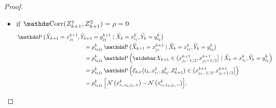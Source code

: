 \begin{proof}
	\begin{itemize}[wide=0pt]
		\item if $\Corr(Z_{k+1}^1, Z_{k+1}^2) = \rho = 0$
		      \begin{equation*}
			      \begin{aligned}
				       & \Prob \big( \widehat X_{k+1} = x_{j_1}^{k+1}, \widehat Y_{k+1} = y_{j_2}^{k+1} \mid \widehat X_k = x_{i_1}^k, \widehat Y_k = y_{i_2}^k \big)                                                             \\
				       & \qquad \qquad \qquad \qquad \qquad \qquad= p_{i_2 j_2}^k \Prob \big( \widehat X_{k+1} = x_{j_1}^{k+1} \mid \widehat X_k = x_{i_1}^k, \widehat Y_k = y_{i_2}^k \big)                                      \\
				       & \qquad \qquad \qquad \qquad \qquad \qquad= p_{i_2 j_2}^k \Prob \Big( \widebar X_{k+1} \in \big( x_{j_1-1/2}^{k+1}, x_{j_1+1/2}^{k+1} \big] \mid \widehat X_k = x_{i_1}^k, \widehat Y_k = y_{i_2}^k \Big) \\
				       & \qquad \qquad \qquad \qquad \qquad \qquad= p_{i_2 j_2}^k \Prob \Big( \mathcal{E}_{b, \sigma} \big( t_k, x_{i_1}^k, y_{i_2}^k, Z_{k+1}^1 \big) \in \big( x_{j_1-1/2}^{k+1}, x_{j_1+1/2}^{k+1} \big] \Big) \\
				       & \qquad \qquad \qquad \qquad \qquad \qquad= p_{i_2 j_2}^k \, \Big[ \N \big( x_{i_1,i_2,j_1,+}^{k} \big) - \N \big( x_{i_1,i_2,j_1,-}^{k} \big) \Big],
			      \end{aligned}
		      \end{equation*}


\end{itemize}
\end{proof}
